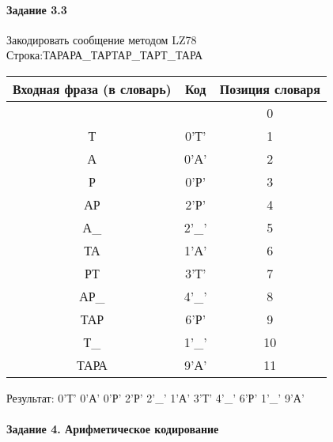 \documentclass[a4paper, 12pt]{article}
\begin{document}
\paragraph{Задание 3.3}

Закодировать сообщение методом LZ78\\
Строка:ТАРАРА\_ТАРТАР\_ТАРТ\_ТАРА\\
\begin{table}[h!]
\centering
\begin{tabular}{|c|c|c|} 
\hline
 Входная фраза (в словарь) & Код & Позиция словаря \\ \hline

 &  & 0 \\ \hline
Т & 0'Т' & 1 \\ \hline
А & 0'А' & 2 \\ \hline
Р & 0'Р' & 3 \\ \hline
АР & 2'Р' & 4 \\ \hline
А\_ & 2'\_' & 5 \\ \hline
ТА & 1'А' & 6 \\ \hline
РТ & 3'Т' & 7 \\ \hline
АР\_ & 4'\_' & 8 \\ \hline
ТАР & 6'Р' & 9 \\ \hline
Т\_ & 1'\_' & 10 \\ \hline
ТАРА & 9'А' & 11 \\ \hline
\end{tabular}
\end{table}

Результат: 0'Т' 0'А' 0'Р' 2'Р' 2'\_' 1'А' 3'Т' 4'\_' 6'Р' 1'\_' 9'А'\\
\pagebreak
\paragraph{Задание 4. Арифметическое кодирование\\}
\end{document}
